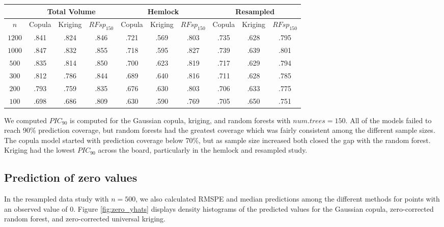 \documentclass{article}
\begin{document}
\begin{center}
\begin{singlespace}
\begin{tabular}{|| c | c c c | c c c | c c c ||}
\hline
\multirow{2}{*}{} &
\multicolumn{3}{c}{Total Volume} &
\multicolumn{3}{c}{Hemlock} &
\multicolumn{3}{c||}{Resampled} \\
\hline
$n$ & Copula & Kriging & $RFsp_{150}$ & Copula & Kriging & $RFsp_{150}$ & Copula & Kriging & $RFsp_{150}$ \\ [.5ex]
\hline\hline
$1200$ & .841 & \cellcolor{gray}.824 & \cellcolor{cyan}.846 & .721 &\cellcolor{gray}.569 &\cellcolor{cyan} .803 &.735 &\cellcolor{gray}.628 & \cellcolor{cyan}.795 \\
$1000$ & .847 &\cellcolor{gray}.832 &\cellcolor{cyan} .855 &.718 &\cellcolor{gray}.595 &\cellcolor{cyan} .827 &.739 &\cellcolor{gray}.639 & \cellcolor{cyan}.801 \\
$500$ & .835 &\cellcolor{gray}.814 &\cellcolor{cyan} .850 & .700 &\cellcolor{gray}.623 &\cellcolor{cyan} .819 &.717 &\cellcolor{gray}.629 & \cellcolor{cyan}.794 \\
$300$ & .812 &\cellcolor{gray}.786 &\cellcolor{cyan} .844 & .689 &\cellcolor{gray}.640 &\cellcolor{cyan} .816 &.711 & \cellcolor{gray}.628 & \cellcolor{cyan}.785 \\
$200$ & .793 &\cellcolor{gray}.759 &\cellcolor{cyan} .835 & .676 &\cellcolor{gray}.630 &\cellcolor{cyan} .803 &.706 &\cellcolor{gray}.633 & \cellcolor{cyan}.775 \\
$100$ & .698 &\cellcolor{gray}.686 &\cellcolor{cyan} .809 & .630 &\cellcolor{gray}.590 &\cellcolor{cyan} .769 &.705 &\cellcolor{gray}.650 & \cellcolor{cyan}.751 \\ [.5ex] 
\hline
\end{tabular}
\end{singlespace}
\end{center}

We computed $PIC_{90}$ is computed for the Gaussian copula, kriging, and random forests with $num.trees=150$.
All of the models failed to reach 90\% prediction coverage, but random forests had the greatest coverage which was fairly consistent among the different sample sizes.
The copula model started with prediction coverage below 70\%, but as sample size increased both closed the gap with the random forest.
Kriging had the lowest $PIC_{90}$ across the board, particularly in the hemlock and resampled study.

\subsection{Prediction of zero values}
In the resampled data study with $n = 500$, we also calculated RMSPE and median predictions among the different methods for points with an observed value of 0.
Figure \ref{fig:zero_yhats} displays density histograms of the predicted values for the Gaussian copula, zero-corrected random forest, and zero-corrected universal kriging. 
\end{document}
